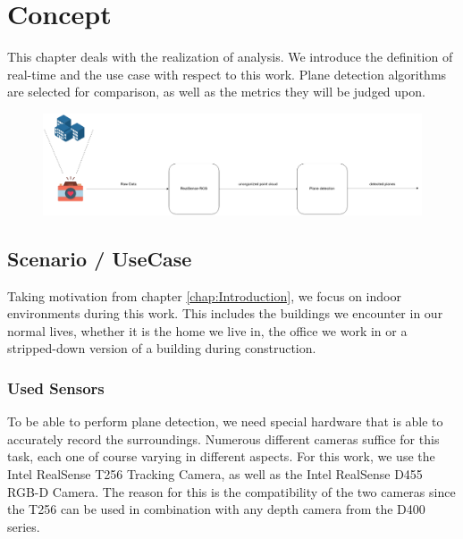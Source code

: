 \documentclass[main.tex]{subfiles}
\begin{document}
\chapter{Concept} \label{chap:Concept}

This chapter deals with the realization of analysis.
We introduce the definition of real-time and the use case with respect to this work.
Plane detection algorithms are selected for comparison, as well as the metrics they will be judged upon.

\begin{figure}[!ht]
	\centering
	\includegraphics[width=15 cm]{images/concept.png}
\end{figure}


\section{Scenario / UseCase}
Taking motivation from chapter \ref{chap:Introduction}, we focus on indoor environments during this work.
This includes the buildings we encounter in our normal lives, whether it is the home we live in, the office we work in or a stripped-down version of a building during construction.


\subsection{Used Sensors}
To be able to perform plane detection, we need special hardware that is able to accurately record the surroundings.
Numerous different cameras suffice for this task, each one of course varying in different aspects.
For this work, we use the Intel RealSense T256 Tracking Camera, as well as the Intel RealSense D455 RGB-D Camera.
The reason for this is the compatibility of the two cameras since the T256 can be used in combination with any depth camera from the D400 series.
\end{document}
